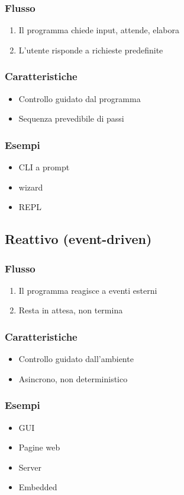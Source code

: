 \subsubsection{Flusso}
\begin{enumerate}
    \item Il programma chiede input, attende, elabora
    \item L'utente risponde a richieste predefinite 
\end{enumerate}
\subsubsection{Caratteristiche}
\begin{itemize}
    \item Controllo guidato dal programma
    \item Sequenza prevedibile di passi
\end{itemize}
\subsubsection{Esempi}
\begin{itemize}
    \item CLI a prompt
    \item wizard
    \item REPL
\end{itemize}
\subsection{Reattivo (event-driven)}
\subsubsection{Flusso}
\begin{enumerate}
    \item Il programma reagisce a eventi esterni
    \item Resta in attesa, non termina
\end{enumerate}
\subsubsection{Caratteristiche}
\begin{itemize}
    \item Controllo guidato dall'ambiente
    \item Asincrono, non deterministico
\end{itemize}
\subsubsection{Esempi}
\begin{itemize}
    \item GUI
    \item Pagine web
    \item Server
    \item Embedded
\end{itemize}

